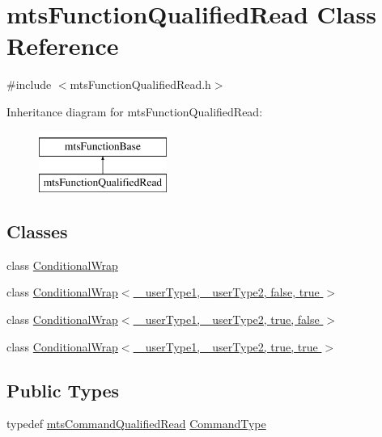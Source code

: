 \hypertarget{classmts_function_qualified_read}{\section{mts\-Function\-Qualified\-Read Class Reference}
\label{classmts_function_qualified_read}
}


{\ttfamily \#include $<$mts\-Function\-Qualified\-Read.\-h$>$}

Inheritance diagram for mts\-Function\-Qualified\-Read\-:\begin{figure}[H]
\begin{center}
\leavevmode
\includegraphics[height=2.000000cm]{d5/d9f/classmts_function_qualified_read}
\end{center}
\end{figure}
\subsection*{Classes}
\begin{DoxyCompactItemize}
\item 
class \hyperlink{classmts_function_qualified_read_1_1_conditional_wrap}{Conditional\-Wrap}
\item 
class \hyperlink{classmts_function_qualified_read_1_1_conditional_wrap_3_01__user_type1_00_01__user_type2_00_01false_00_01true_01_4}{Conditional\-Wrap$<$ \-\_\-user\-Type1, \-\_\-user\-Type2, false, true $>$}
\item 
class \hyperlink{classmts_function_qualified_read_1_1_conditional_wrap_3_01__user_type1_00_01__user_type2_00_01true_00_01false_01_4}{Conditional\-Wrap$<$ \-\_\-user\-Type1, \-\_\-user\-Type2, true, false $>$}
\item 
class \hyperlink{classmts_function_qualified_read_1_1_conditional_wrap_3_01__user_type1_00_01__user_type2_00_01true_00_01true_01_4}{Conditional\-Wrap$<$ \-\_\-user\-Type1, \-\_\-user\-Type2, true, true $>$}
\end{DoxyCompactItemize}
\subsection*{Public Types}
\begin{DoxyCompactItemize}
\item 
typedef \hyperlink{classmts_command_qualified_read}{mts\-Command\-Qualified\-Read} \hyperlink{classmts_function_qualified_read_ae78bcee54ee0392f510d2f33600c316f}{Command\-Type}
\end{DoxyCompactItemize}
